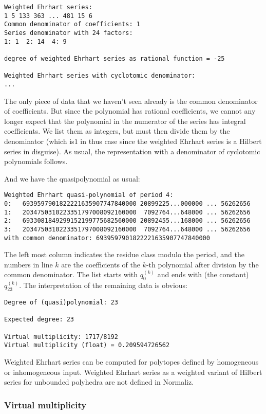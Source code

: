 \documentclass[12pt,a4paper]{scrartcl}
\theoremstyle{definition}
\begin{document}
\begin{Verbatim}
Weighted Ehrhart series:
1 5 133 363 ... 481 15 6
Common denominator of coefficients: 1
Series denominator with 24 factors:
1: 1  2: 14  4: 9

degree of weighted Ehrhart series as rational function = -25

Weighted Ehrhart series with cyclotomic denominator:
...
\end{Verbatim}
The only piece of data that we haven't seen already is the common denominator of coefficients. But since the polynomial has rational coefficients, we cannot any longer expect that the polynomial in the numerator of the series has integral coefficients. We list them as integers, but must then divide them by the denominator (which is$1$ in thus case since the weighted Ehrhart series is a Hilbert series in disguise). As usual, the representation with a denominator of cyclotomic polynomials follows.

And we have the quasipolynomial as usual:

\begin{Verbatim}
Weighted Ehrhart quasi-polynomial of period 4:
0:   6939597901822221635907747840000 20899225...000000 ... 56262656
1:   2034750310223351797008092160000  7092764...648000 ... 56262656
2:   6933081849299152199775682560000 20892455...168000 ... 56262656
3:   2034750310223351797008092160000  7092764...648000 ... 56262656
with common denominator: 6939597901822221635907747840000
\end{Verbatim}

The left most column indicates the residue class modulo the period, and the
numbers in line $k$ are the coefficients of the $k$-th polynomial after
division by the common denominator. The list starts with $q_0^{(k)}$ and ends
with (the constant) $q_{23}^{(k)}$.
The interpretation of the remaining data is obvious:

\begin{Verbatim}
Degree of (quasi)polynomial: 23

Expected degree: 23

Virtual multiplicity: 1717/8192
Virtual multiplicity (float) = 0.209594726562
\end{Verbatim}

Weighted Ehrhart series can be computed for polytopes defined by homogeneous or inhomogeneous input. Weighted Ehrhart series as a weighted variant of Hilbert series for unbounded polyhedra are not defined in Normaliz.


\subsubsection{Virtual multiplicity}
\end{document}
